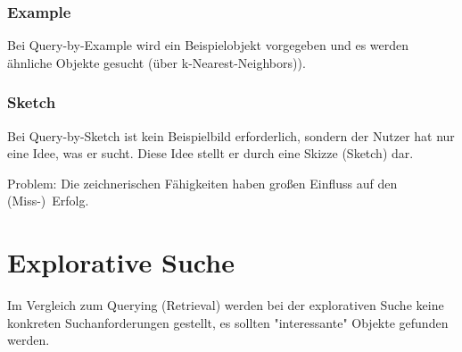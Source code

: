 			\subsubsection{Example}
				Bei Query-by-Example wird ein Beispielobjekt vorgegeben und es werden ähnliche Objekte gesucht (\zB über k-Nearest-Neighbors)).

			\subsubsection{Sketch}
				Bei Query-by-Sketch ist kein Beispielbild erforderlich, sondern der Nutzer hat nur eine Idee, was er sucht. Diese Idee stellt er durch eine Skizze (Sketch) dar.

				Problem: Die zeichnerischen Fähigkeiten haben großen Einfluss auf den (Miss-)~Erfolg.

	\section{Explorative Suche}
		Im Vergleich zum Querying (Retrieval) werden bei der explorativen Suche keine konkreten Suchanforderungen gestellt, \dh es sollten "interessante" Objekte gefunden werden.
